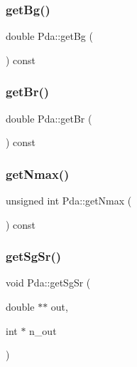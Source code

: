 \subsubsection{\texorpdfstring{get\+Bg()}{getBg()}}
{\footnotesize\ttfamily double Pda\+::get\+Bg (\begin{DoxyParamCaption}{ }\end{DoxyParamCaption}) const}

\mbox{\label{class_pda_adc2d16391e665139ea51a3489e7d8e3c}} 
\subsubsection{\texorpdfstring{get\+Br()}{getBr()}}
{\footnotesize\ttfamily double Pda\+::get\+Br (\begin{DoxyParamCaption}{ }\end{DoxyParamCaption}) const}

\mbox{\label{class_pda_aca50144f22170263ef05997e5eefeff6}} 
\subsubsection{\texorpdfstring{get\+Nmax()}{getNmax()}}
{\footnotesize\ttfamily unsigned int Pda\+::get\+Nmax (\begin{DoxyParamCaption}{ }\end{DoxyParamCaption}) const}

\mbox{\label{class_pda_a15729ff6d80f086e7f6ae4232444dc05}} 
\subsubsection{\texorpdfstring{get\+Sg\+Sr()}{getSgSr()}}
{\footnotesize\ttfamily void Pda\+::get\+Sg\+Sr (\begin{DoxyParamCaption}\item[{double $\ast$$\ast$}]{out,  }\item[{int $\ast$}]{n\+\_\+out }\end{DoxyParamCaption})}

\mbox{\label{class_pda_a64baea621f7aef17b43ee65b2a0c0aff}} 
